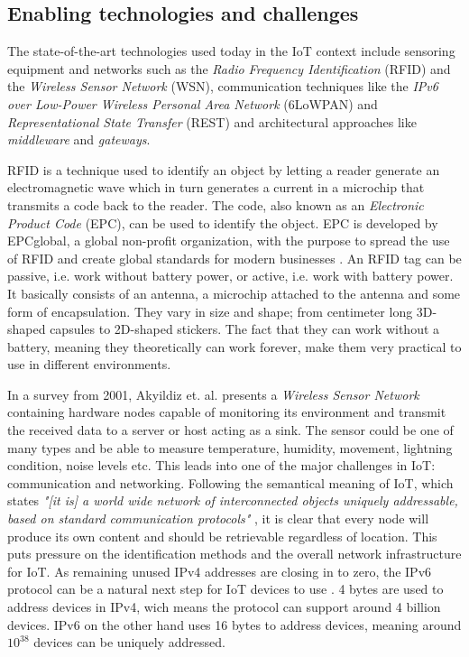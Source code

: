 \subsection{Enabling technologies and challenges}

The state-of-the-art technologies used today in the IoT context include
sensoring equipment and networks such as the \textit{Radio Frequency
Identification} (RFID) and the \textit{Wireless Sensor Network} (WSN),
communication techniques like the \textit{IPv6 over Low-Power Wireless Personal
Area Network} (6LoWPAN) and \textit{Representational State Transfer} (REST) and
architectural approaches like \textit{middleware} and \textit{gateways}.

RFID is a technique used to identify an object by letting a reader generate an
electromagnetic wave which in turn generates a current in a microchip that
transmits a code back to the reader. The code, also known as an
\textit{Electronic Product Code} (EPC), can be used to identify the object. EPC
is developed by EPCglobal, a global non-profit organization, with the purpose
to spread the use of RFID and create global standards for modern businesses
\cite{atzori2010internet}. An RFID tag can be passive, i.e. work without
battery power, or active, i.e. work with battery power. It basically consists
of an antenna, a microchip attached to the antenna and some form of
encapsulation. They vary in size and shape; from centimeter long 3D-shaped
capsules to 2D-shaped stickers. The fact that they can work without a battery,
meaning they theoretically can work forever, make them very practical to use in
different environments. \cite{want2006introduction}

In a survey from 2001, Akyildiz et. al.  \cite{akyildiz2002wireless} presents a
\textit{Wireless Sensor Network} containing hardware nodes capable of
monitoring its environment and transmit the received data to a server or host
acting as a sink. The sensor could be one of many types and be able to measure
temperature, humidity, movement, lightning condition, noise levels etc. This
leads into one of the major challenges in IoT: communication and networking.
Following the semantical meaning of IoT, which states \textit{"[it is] a world
wide network of interconnected objects uniquely addressable, based on standard
communication protocols"} \cite{bassi2008internet}, it is clear that every node
will produce its own content and should be retrievable regardless of location.
This puts pressure on the identification methods and the overall network
infrastructure for IoT. As remaining unused IPv4 addresses are closing in to
zero, the IPv6 protocol can be a natural next step for IoT devices to use
\cite{atzori2010internet}. 4 bytes are used to address devices in IPv4, wich
means the protocol can support around 4 billion devices. IPv6 on the other hand
uses 16 bytes to address devices, meaning around $10^{38}$ devices can be
uniquely addressed.

